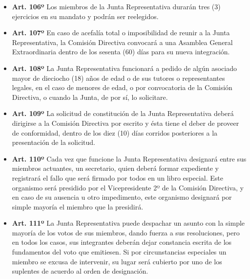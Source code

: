 \documentclass[]{book}
\providecommand{\tightlist}{%
  \setlength{\itemsep}{0pt}\setlength{\parskip}{0pt}}
\begin{document}
\begin{itemize}
\tightlist
\item
  \textbf{Art. 106º}
  Los miembros de la Junta Representativa durarán tres (3) ejercicios en su mandato y podrán ser reelegidos.
\end{itemize}

\begin{itemize}
\tightlist
\item
  \textbf{Art. 107º}
  En caso de acefalía total o imposibilidad de reunir a la Junta Representativa, la Comisión Directiva convocará a una Asamblea General Extraordinaria dentro de los sesenta (60) días para su nueva integración.
\end{itemize}

\begin{itemize}
\tightlist
\item
  \textbf{Art. 108º}
  La Junta Representativa funcionará a pedido de algún asociado mayor de dieciocho (18) años de edad o de sus tutores o representantes legales, en el caso de menores de edad, o por convocatoria de la Comisión Directiva, o cuando la Junta, de por sí, lo solicitare.
\end{itemize}

\begin{itemize}
\tightlist
\item
  \textbf{Art. 109º}
  La solicitud de constitución de la Junta Representativa deberá dirigirse a la Comisión Directiva por escrito y ésta tiene el deber de proveer de conformidad, dentro de los diez (10) días corridos posteriores a la presentación de la solicitud.
\end{itemize}

\begin{itemize}
\tightlist
\item
  \textbf{Art. 110º}
  Cada vez que funcione la Junta Representativa designará entre sus miembros actuantes, un secretario, quien deberá formar expediente y registrará el fallo que será firmado por todos en un libro especial. Este organismo será presidido por el Vicepresidente 2º de la Comisión Directiva, y en caso de su ausencia u otro impedimento, este organismo designará por simple mayoría el miembro que la presidirá.
\end{itemize}

\begin{itemize}
\tightlist
\item
  \textbf{Art. 111º}
  La Junta Representativa puede despachar un asunto con la simple mayoría de los votos de sus miembros, dando fuerza a sus resoluciones, pero en todos los casos, sus integrantes deberán dejar constancia escrita de los fundamentos del voto que emitiesen. Si por circunstancias especiales un miembro se excusa de intervenir, su lugar será cubierto por uno de los suplentes de acuerdo al orden de designación.
\end{itemize}
\end{document}
